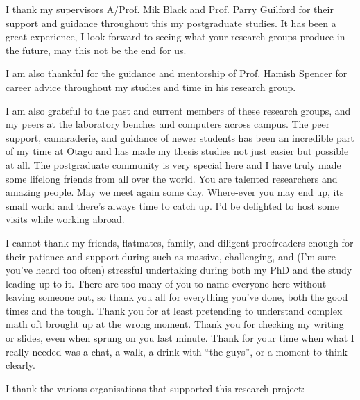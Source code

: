 I thank my supervisors A/Prof. Mik Black and Prof. Parry Guilford for their support and guidance throughout this my postgraduate studies. It has been a great experience, I look forward to seeing what your research groups produce in the future, may this not be the end for us.

I am also thankful for the guidance and mentorship of Prof. Hamish Spencer for career advice throughout my studies and time in his research group.

I am also grateful to the past and current members of these research groups, and my peers at the laboratory benches and computers across campus. The peer support, camaraderie, and guidance of newer students has been an incredible part of my time at Otago and has made my thesis studies not just easier but possible at all. The postgraduate community is very special here and I have truly made some lifelong friends from all over the world. You are talented researchers and amazing people. May we meet again some day. Where-ever you may end up, its small world and there's always time to catch up. I'd be delighted to host some visits while working abroad.

I cannot thank my friends, flatmates, family, and diligent proofreaders enough for their patience and support during such as massive, challenging, and (I'm sure you've heard too often) stressful undertaking during both my PhD and the study leading up to it. There are too many of you to name everyone here without leaving someone out, so thank you all for everything you've done, both the good times and the tough. Thank you for at least pretending to understand complex math oft brought up at the wrong moment. Thank you for checking my writing or slides, even when sprung on you last minute. Thank for your time when what I really needed was a chat, a walk, a drink with ``the guys'', or a moment to think clearly.

I thank the various organisations that supported this research project:

